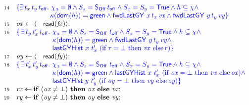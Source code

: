 \begin{figure}[t]
\[\begin{array}[t]{r l}
  \num{14} & \specK{\{ \exists\, t_x\, t_y\, \toff \ldot\, \histS = \hempty \wedge
             \sss = \sOff\, \toff \wedge \sx = \sy = \TT  \wedge
             h \subseteq \hist \wedge}\\
           & \specK{\hphantom{\{ \exists\, t_x \, t_y\, \toff\ldot}
             \C(\dom{h}) = \mathsf{green} \wedge    
            \botLGY\ x\, t_x\, \var{vx} \wedge \botLGY\ y\, t_y\, \var{vy}\}} \\
  \num{15} & \var{ox} \tbnd \lat \act{read}(\var{\fx}) \rat;\\
  \num{16} & \specK{\{\, \exists\, t_y\, t'_x\, \toff \ldot\,
              \histS = \hempty \wedge
              \sss = \sOff\ \toff \wedge \sx = \sy = \TT \wedge
              h \subseteq \hist \wedge}\\
           & \specK{\hphantom{\{\, \exists\, t_y\, t'_x\, \toff \ldot}\,
              \C(\dom{h}) = \mathsf{green} \wedge
              \botLGY\ y\, t_y\, \var{vy} \wedge}\\
           & \specK{\hphantom{\{\, \exists\, t_y\, t'_x\, \toff \ldot}\,
              \histLGY\ x\ t'_x\ (\textrm{if}\ r = \bot\
                   \textrm{then}\ \var{vx}\ \textrm{else}\, r)\}}\\
  \num{17} & \var{oy} \tbnd \lat \act{read}(\var{\fy}) \rat;\\
  \num{18} & \specK{\{\, \exists\, t'_x\, t'_y\, \toff \ldot\,
              \histS = \hempty \wedge
              \sss = \sOff\ \toff \wedge \sx = \sy = \TT \wedge
              h \subseteq \hist \wedge}\\
             & \specK{\hphantom{\{\,
                  \exists\, t'_x\, t'_y\, \toff \ldot}\,
              \C(\dom{h}) = \mathsf{green} \wedge
              \histLGY\ x\ t'_x\
                      (\textrm{if}\ \var{ox} = \bot\
                       \textrm{then}\ \var{vx}\
                       \textrm{else}\, \var{ox}) \wedge}\\
             & \specK{\hphantom{\{\,
                  \exists\, t'_x\, t'_y\, \toff \ldot}\,
                 \histLGY\ y\ t'_y\
                       (\textrm{if}\ \var{oy} = \bot\
                        \textrm{then}\ \var{vy}\ \textrm{else}\, \var{oy})\}}\\
  \num{19} & \var{rx} \tbnd \kw{if}\ (\var{ox} \neq\bot)\
                \kw{then}\ \var{ox}\ \kw{else}\ \var{vx};\\
  \num{20} & \var{ry} \tbnd \kw{if}\ (\var{oy} \neq\bot)\
                 \kw{then}\ \var{oy}\ \kw{else}\ \var{vy};\\

\end{array}\]
\end{figure}
